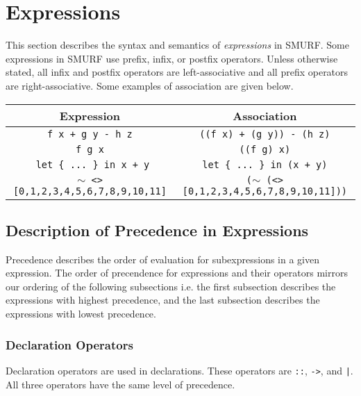\section{Expressions}

This section describes the syntax and semantics of \emph{expressions} in 
SMURF. Some expressions in SMURF use prefix, infix, or postfix operators.
Unless otherwise stated, all infix and postfix operators are left-associative and
all prefix operators are right-associative. Some examples of association are given below.


\begin{center}
	\begin{tabular}{|c|c|}
		\hline
		Expression & Association \\
		\hline
		\texttt{f x + g y - h z} & \texttt{((f x) + (g y)) - (h z)} \\
		\texttt{f g x} & \texttt{((f g) x)} \\
		\texttt{ let \{ ... \} in x + y} & \texttt{let \{ ... \} in (x + y)} \\
		\texttt{$\sim$ <> [0,1,2,3,4,5,6,7,8,9,10,11]} &
					\texttt{($\sim$ (<> [0,1,2,3,4,5,6,7,8,9,10,11]))}\\
		\hline
	\end{tabular}
\end{center}

%
%
%
\subsection{Description of Precedence in Expressions}
Precedence describes the order of evaluation for subexpressions in a given expression.
The order of precendence for expressions and their operators mirrors our ordering of the following
subsections i.e. the first subsection describes the expressions with highest precedence, and the last
subsection describes the expressions with lowest precedence.

\subsubsection{Declaration Operators}
Declaration operators are used in declarations. These 
operators are \texttt{::}, \texttt{->}, and \texttt{|}. 
All three operators have the same level of precedence. 
